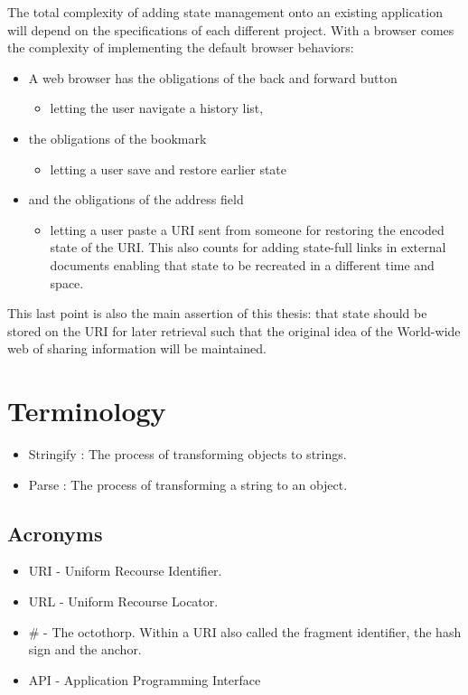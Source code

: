 \documentclass[english]{ifimaster}
\begin{document}
The total complexity of adding state management onto an existing application will depend on the specifications of each different project. With a browser comes the complexity of implementing the default browser behaviors:

\begin{itemize}
\item A web browser has the obligations of the back and forward button
  \begin{itemize} 
    \item letting the user navigate a history list, 
  \end{itemize}

\item the obligations of the bookmark
  \begin{itemize}
    \item letting a user save and restore earlier state
  \end{itemize}
 \item and the obligations of the address field
  \begin{itemize}
    \item letting a user paste a URI sent from someone for restoring the encoded state of the URI. This also counts for adding state-full links in external documents enabling that state to be recreated in a different time and space.
  \end{itemize} 
\end{itemize}
This last point is also the main assertion of this thesis: that state should be stored on the URI for later retrieval such that the original idea of the World-wide web of sharing information will be maintained.


\section{Terminology}
\begin{itemize}
\item[] Stringify : The process of transforming objects to strings. 

\item[] Parse : The process of transforming a string to an object.
\end{itemize}

\subsection{Acronyms}

\begin{itemize}
\item[] URI  - Uniform Recourse Identifier.
\item[] URL  - Uniform Recourse Locator. 
\item[]\#    - The octothorp. Within a URI also called the fragment identifier, the hash sign and the anchor. 
\item[] API - Application Programming Interface
\end{itemize}
\end{document}
